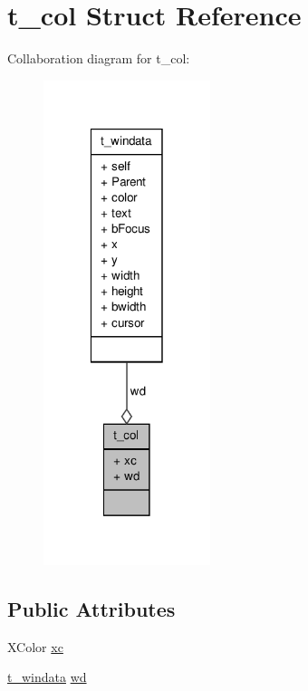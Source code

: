 \hypertarget{structt__col}{\section{t\-\_\-col \-Struct \-Reference}
\label{structt__col}
}


\-Collaboration diagram for t\-\_\-col\-:
\nopagebreak
\begin{figure}[H]
\begin{center}
\leavevmode
\includegraphics[width=138pt]{structt__col__coll__graph}
\end{center}
\end{figure}
\subsection*{\-Public \-Attributes}
\begin{DoxyCompactItemize}
\item 
\-X\-Color \hyperlink{structt__col_aa83446cf0a1dd0fc97a840c74bfbdc76}{xc}
\item 
\hyperlink{structt__windata}{t\-\_\-windata} \hyperlink{structt__col_a98331be174931694f46de4bcaeb9536b}{wd}
\end{DoxyCompactItemize}


